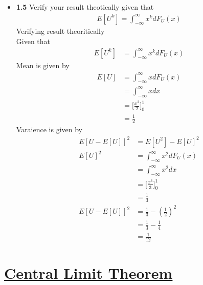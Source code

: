 \documentclass[journal,12pt,twocolumn]{IEEEtran}
\begin{document}
\begin{itemize}
    \item \textbf{1.5} Verify your result theotically given that 
    \begin{align}
        E[U^k] = \int_{-\infty}^{\infty} x^k dF_U(x) 
    \end{align}
    \solution Verifying result theoritically\\
    Given that
    \begin{align}
        E[U^k] &= \int_{-\infty}^{\infty} x^k dF_U(x)
    \end{align}
    Mean is given by
    \begin{align}
        E[U] &= \int_{-\infty}^{\infty} x dF_U(x) \\
        &= \int_{-\infty}^{\infty} x dx \\
        &= \bigg[\frac{x^2}{2}\bigg]_0^1 \\
        &= \frac{1}{2}
    \end{align}
    Varaience is given by
    \begin{align}
        E[U-E[U]]^2 &= E[U^2] - E[U]^2 \\
        E[U]^2 &= \int_{-\infty}^{\infty} x^2 dF_U(x)\\
        &= \int_{-\infty}^{\infty} x^2 dx \\
        &= \bigg[\frac{x^3}{3}\bigg]_0^1 \\
        &= \frac{1}{3} \\
        E[U-E[U]]^2 &= \frac{1}{3} - (\frac{1}{2})^2 \\
        &= \frac{1}{3} - \frac{1}{4} \\
        &= \frac{1}{12}
    \end{align}
\end{itemize}

\section{\underline{Central Limit Theorem}}
\end{document}
